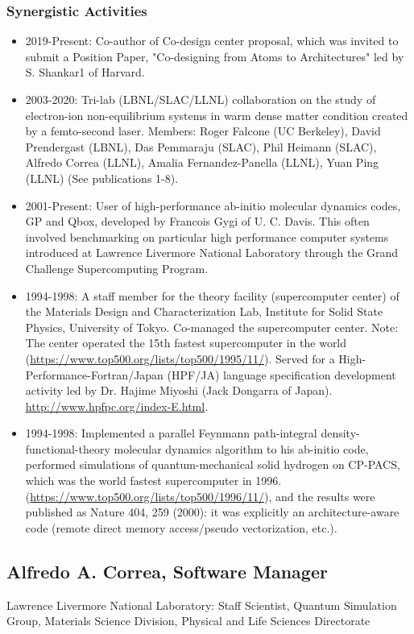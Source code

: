 \subsubsection*{Synergistic Activities}
\begin{itemize}
    \item 2019-Present: Co-author of Co-design center proposal, which was invited to submit a Position Paper, "Co-designing from Atoms to Architectures" led by S. Shankar1 of Harvard.
    \item 2003-2020: Tri-lab (LBNL/SLAC/LLNL) collaboration on the study of electron-ion non-equilibrium systems in warm dense matter condition created by a femto-second laser. Members: Roger Falcone (UC Berkeley), David Prendergast (LBNL), Das Pemmaraju (SLAC), Phil Heimann (SLAC), Alfredo Correa (LLNL), Amalia Fernandez-Panella (LLNL), Yuan Ping (LLNL) (See publications 1-8).
    \item 2001-Present: User of high-performance ab-initio molecular dynamics codes, GP and Qbox, developed by Francois Gygi of U. C. Davis. This often involved benchmarking on particular high performance computer systems introduced at Lawrence Livermore National Laboratory through the Grand Challenge Supercomputing Program.  
    \item 1994-1998: A staff member for the theory facility (supercomputer center) of the Materials Design and Characterization Lab, Institute for Solid State Physics, University of Tokyo. Co-managed the supercomputer center. Note: The center operated the 15th fastest supercomputer in the world (\url{https://www.top500.org/lists/top500/1995/11/}). Served for a High-Performance-Fortran/Japan (HPF/JA) language specification development activity led by Dr. Hajime Miyoshi (Jack Dongarra of Japan). 
    \url{http://www.hpfpc.org/index-E.html}.
    \item 1994-1998: Implemented a parallel Feynmann path-integral density-functional-theory molecular dynamics algorithm to his ab-initio code, performed simulations of quantum-mechanical solid hydrogen on CP-PACS, which was the world fastest supercomputer in 1996. 
    (\url{https://www.top500.org/lists/top500/1996/11/}), and the results were published as Nature 404, 259 (2000): it was explicitly an architecture-aware code (remote direct memory access/pseudo vectorization, etc.).
\end{itemize}
\clearpage


\subsection*{Alfredo A. Correa, Software Manager}
Lawrence Livermore National Laboratory: Staff Scientist, Quantum Simulation Group, Materials Science Division, Physical and Life Sciences Directorate

